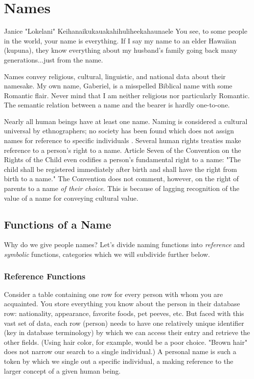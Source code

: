 \section{Names}

\begin{aquote}{Janice "Lokelani" Keihanaikukauakahihuliheekahaunaele}
You see, to some people in the world, your name is everything. If I say my name
to an elder Hawaiian (kupuna), they know everything about my husband's family
going back many generations...just from the name. \parencite{lee-valley}
\end{aquote}

Names convey religious, cultural, linguistic, and national data about their
namesake. My own name, Gaberiel, is a misspelled Biblical name with some
Romantic flair. Never mind that I am neither religious nor particularly
Romantic. The semantic relation between a name and the bearer is hardly
one-to-one.

Nearly all human beings have at least one name. Naming is considered
a cultural universal by ethnographers; no society has been found which does not
assign names for reference to specific individuals \parencite{alford88}. Several
human rights treaties make reference to a person's right to a name. Article
Seven of the Convention on the Rights of the Child even codifies a person's
fundamental right to a name: "The child shall be registered immediately after
birth and shall have the right from birth to a name." \parencite{crc} The
Convention does not comment, however, on the right of parents to a name
\textit{of their choice}. This is because of lagging recognition of the value of
a name for conveying cultural value.

\subsection{Functions of a Name}

Why do we give people names? Let's divide naming functions into
\textit{reference} and \textit{symbolic} functions, categories which we will
subdivide further below.

\subsubsection{Reference Functions}

Consider a table containing one row for every person with whom you are
acquainted. You store everything you know about the person in their database
row: nationality, appearance, favorite foods, pet peeves, etc. But faced with
this vast set of data, each row (person) needs to have one relatively unique
identifier (key in database terminology) by which we can access their entry and
retrieve the other fields. (Using hair color, for example, would be a poor
choice. "Brown hair" does not narrow our search to a single individual.) A
personal name is such a token by which we single out a specific individual, a
making reference to the larger concept of a given human being.

